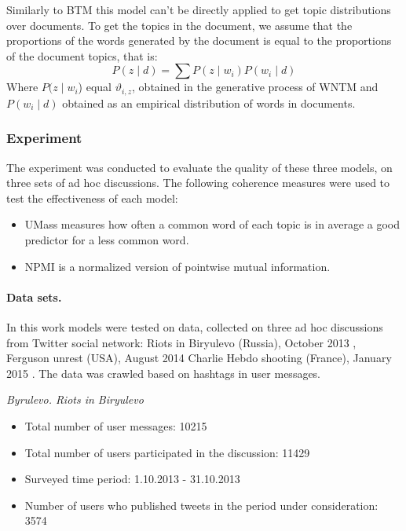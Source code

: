 Similarly to BTM this model can’t be directly applied to get topic distributions over documents. To get the topics in the document, we assume that the proportions of the words generated by the document is equal to the proportions of the document topics, that is:
\begin{equation}
	\label{eqn:30}
	P(z \mid d) = \sum P(z \mid w_i) P(w_i \mid d)
\end{equation}
Where \(P(z \mid w_i\)) equal \(\vartheta_{i,z}\), obtained in the generative process of WNTM and \(P(w_i \mid d)\) obtained as an empirical distribution of words in documents.

\subsubsection{Experiment}

The experiment was conducted to evaluate the quality of these three models, on three sets of ad hoc discussions. The following coherence measures were used to test the effectiveness of each model:

\begin{itemize}
	\item UMass \cite{MimnoWallachTalley} measures how often a common word of each topic is in average a good predictor for a less common word.
	\item NPMI \cite{StevesonAletras} is a normalized version of pointwise mutual information.
\end{itemize}

\paragraph{Data sets.} In this work models were tested on data, collected on three ad hoc discussions from Twitter social network: Riots in Biryulevo (Russia), October 2013 \cite{BodrunovaLitvinenkoBlekanov}, Ferguson unrest (USA), August 2014 \cite{SmoliarovaBlekanovBodrunova} Charlie Hebdo shooting (France), January 2015 \cite{SmoliarovaBlekanovLitvinenko}. The data was crawled based on hashtags in user messages.

\textit{Byrulevo. Riots in Biryulevo}
\begin{itemize}
	\item Total number of user messages: 10215
	\item Total number of users participated in the discussion: 11429
	\item Surveyed time period: 1.10.2013 - 31.10.2013
	\item Number of users who published tweets in the period under consideration: 3574
\end{itemize}


